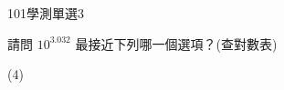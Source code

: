     \begin{QUESTION}
        \begin{ExamInfo}{101}{學測}{單選}{3}
        \end{ExamInfo}
        \begin{ExamAnsRateInfo}{36}{64}{27}{17}
        \end{ExamAnsRateInfo}
        \begin{QBODY}
            請問 $10^{3.032}$ 最接近下列哪一個選項？(查對數表) 
			\begin{QOPS}
			\end{QOPS}
        \end{QBODY}
        \begin{QFROMS}
        \end{QFROMS}
        \begin{QTAGS}\end{QTAGS}
        \begin{QANS}
            (4)
        \end{QANS}
        \begin{QSOLLIST}
        \end{QSOLLIST}
        \begin{QEMPTYSPACE}
        \end{QEMPTYSPACE}
    \end{QUESTION}
